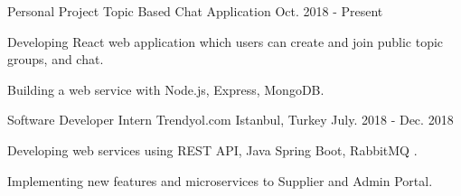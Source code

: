 
\begin{cventries}
  \cventry
   {Personal Project} %
    {Topic Based Chat Application} %
    {} %
    {Oct. 2018 - Present} %
    {
      \begin{cvitems} %
      	\item {Developing React web application which users can create and join public topic groups, and chat. } 
        \item {Building a web service with Node.js, Express, MongoDB.} 
      \end{cvitems}
    }

  \cventry
   {Software Developer Intern} %
    {Trendyol.com} %
    {Istanbul, Turkey} %
    {July. 2018 - Dec. 2018} %
    {
      \begin{cvitems} %
		\item {Developing web services using REST API, Java Spring Boot, RabbitMQ .}
        \item {Implementing new features and microservices to Supplier and Admin Portal.}
      \end{cvitems}
    }


\end{cventries}
